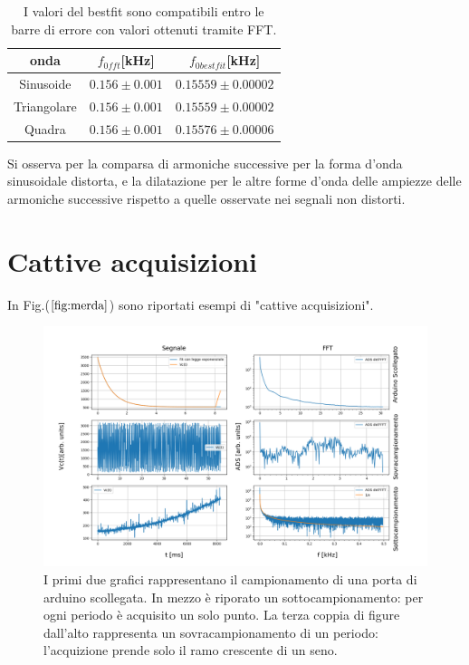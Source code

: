 \documentclass{article}
\begin{document}
        \begin{table}[H]
            \centering

                \begin{tabular}{ccc}
                    onda            &   $f_{0fft}$[kHz]                     & $f_{0bestfit}$[kHz] \\
                    \hline
                    Sinusoide       &   $0.156 \pm 0.001$           & $0.15559 \pm 0.00002$ \\
                    Triangolare     &   $0.156 \pm 0.001$           & $0.15559 \pm 0.00002$ \\
                    Quadra          &   $0.156 \pm 0.001$           & $0.15576 \pm 0.00006$ \\
                \end{tabular}
                \caption{I valori del bestfit sono compatibili entro le barre di errore
                con valori ottenuti tramite FFT.}
                \label{tab:for_dis}
        \end{table}
    Si osserva per la comparsa di armoniche successive 
    per la forma d'onda sinusoidale distorta, e la dilatazione per le altre 
    forme d'onda delle ampiezze delle armoniche successive rispetto
    a quelle osservate nei segnali non distorti.

\section{Cattive acquisizioni}

    In Fig.($\ref{fig:merda}$) sono riportati esempi di "cattive acquisizioni".

        \begin{figure}[H]
            \centering
            \includegraphics[scale=0.45]{FFT5/FFTwaveforms4.png}
            \caption{I primi due grafici rappresentano il campionamento di una porta di arduino scollegata.
            In mezzo è riporato un sottocampionamento: per ogni periodo è acquisito un 
            solo punto.
            La terza coppia di figure dall'alto rappresenta un sovracampionamento 
            di un periodo: l'acquizione prende  solo il ramo crescente di un seno.}
            \label{fig:merda}
        \end{figure}  
    
\end{document}
